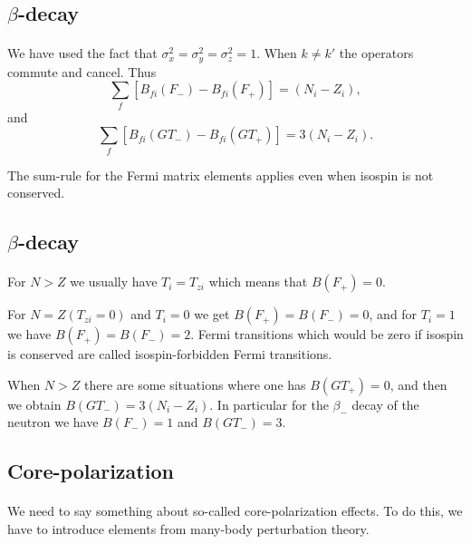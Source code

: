 \documentclass[%
oneside,                 %
final,                   %
10pt]{article}
\begin{document}
\subsection{$\beta$-decay}

\paragraph{}
We have used the fact that $\sigma ^{2}_{x} = \sigma ^{2}_{y}=\sigma ^{2}_{z}=1$.
When $k \neq k'$ the operators commute and cancel.
Thus
\[
\sum_{f} \left[B_{fi}(F_{-}) - B_{fi}(F_{+}) \right] = (N_{i}-Z_{i}),       
\]
and
\[
\sum_{f} \left[ B_{fi}(GT_{-}) - B_{fi}(GT_{+}) \right] = 3(N_{i}-Z_{i}).       
\]

The sum-rule for the Fermi matrix elements applies even
when isospin is not conserved.



\subsection{$\beta$-decay}

\paragraph{}
For $N > Z$ we usually have
$T_{i}=T_{zi}$ which means that $B(F_{+})=0$.

For $N=Z (T_{zi}=0)$ and $T_{i}=0$ we get 
$B(F_{+})=B(F_{-})=0$, and for $T_{i}=1$ we
have $B(F_{+}) = B(F_{-}) = 2$. Fermi transitions which would be zero
if isospin is conserved are called isospin-forbidden Fermi transitions.

When $N > Z$ there are some situations where one has $B(GT_{+})=0$,
and then we obtain $B(GT_{-}) = 3(N_{i}-Z_{i})$. In particular
for the $\beta_{-}$ decay of the neutron we have $B(F_{-})=1$
and $B(GT_{-})=3$.










\subsection{Core-polarization}

\paragraph{}
We need to say something about so-called core-polarization effects.
To do this, we have to introduce elements from many-body perturbation theory.
\end{document}

